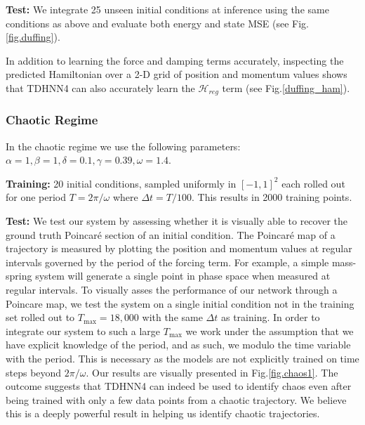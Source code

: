\documentclass[twoside]{article}
\begin{document}
\textbf{Test:} We integrate 25 unseen initial conditions at inference using the same conditions as above and evaluate both energy and state MSE (see Fig.\ref{fig.duffing}).

In addition to learning the force and damping terms accurately, inspecting the predicted Hamiltonian over a 2-D grid of position and momentum values shows that TDHNN4 can also accurately learn the $\mathcal{H}_{reg}$ term (see Fig.\ref{duffing_ham}).

\subsubsection{Chaotic Regime}

In the chaotic regime we use the following parameters:
$\alpha =1,\beta=1,\delta=0.1,\gamma=0.39,\omega=1.4$. 

\textbf{Training:} 20 initial conditions, sampled uniformly in $[-1,1]^2$ each rolled out for one period $T=2\pi/\omega$ where $\Delta t = T/100$. This results in 2000 training points.

\textbf{Test:} We test our system by assessing whether it is visually able to recover the ground truth Poincar\'e section of an initial condition. The Poincar\'e map of a trajectory is measured by plotting the position and momentum values at regular intervals governed by the period of the forcing term. For example, a simple mass-spring system will generate a single point in phase space when measured at regular intervals. To visually asses the performance of our network through a Poincare map, we test the system on a single initial condition not in the training set rolled out to $T_{\max} = 18,000$ with the same $\Delta t$ as training. In order to integrate our system to such a large $T_{\max}$ we work under the assumption that we have explicit knowledge of the period, and as such, we modulo the time variable with the period. This is necessary as the models are not explicitly trained on time steps beyond $2\pi/\omega$. Our results are visually presented in Fig.\ref{fig.chaos1}. The outcome suggests that TDHNN4 can indeed be used to identify chaos even after being trained with only a few data points from a chaotic trajectory. We believe this is a deeply powerful result in helping us identify chaotic trajectories.
\end{document}
